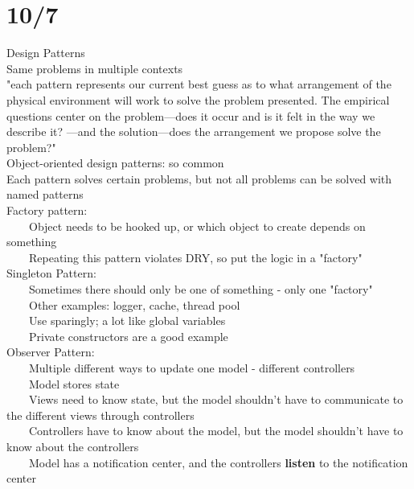 \documentclass[10pt,letterpaper,unboxed,cm]{article}
\newcommand{\tab}{~~~~}
\begin{document}
\section{10/7}
Design Patterns\\
Same problems in multiple contexts\\
"each pattern represents our current best guess as to what arrangement of the physical environment will work to solve the problem presented. The empirical
questions center on the problem---does it occur and is it felt in the way we describe it? ---and the solution---does the arrangement we propose solve the problem?"\\
Object-oriented design patterns: so common\\
Each pattern solves certain problems, but not all problems can be solved with named patterns\\
Factory pattern: \\
\tab Object needs to be hooked up, or which object to create depends on something\\
\tab Repeating this pattern violates DRY, so put the logic in a "factory"\\
Singleton Pattern:\\
\tab Sometimes there should only be one of something - only one "factory"\\
\tab Other examples: logger, cache, thread pool\\
\tab Use sparingly; a lot like global variables\\
\tab Private constructors are a good example\\
Observer Pattern:\\
\tab Multiple different ways to update one model - different controllers\\
\tab Model stores state\\
\tab Views need to know state, but the model shouldn't have to communicate to the different views through controllers\\
\tab Controllers have to know about the model, but the model shouldn't have to know about the controllers\\
\tab Model has a notification center, and the controllers \textbf{listen} to the notification center\\
\end{document}
